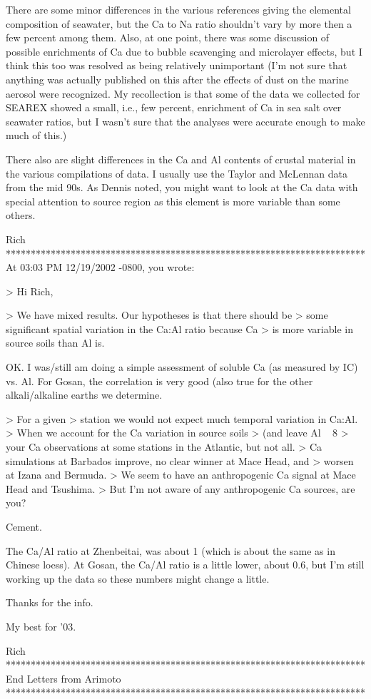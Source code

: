 \documentclass[final,dvips]{foils}
\begin{document}
{There are some minor differences in the various references giving the
elemental composition of seawater, but the Ca to Na ratio shouldn't
vary by more then a few percent among them.  Also, at one point, there
was some discussion of possible enrichments of Ca due to bubble
scavenging and microlayer effects, but I think this too was resolved
as being relatively unimportant (I'm not sure that anything was
actually published on this after the effects of dust on the marine
aerosol were recognized.  My recollection is that some of the data we
collected for SEAREX showed a small, i.e., few percent, enrichment of
Ca in sea salt over seawater ratios, but I wasn't sure that the
analyses were accurate enough to make much of this.) 

There also are slight differences in the Ca and Al contents of crustal
material in the various compilations of data.  I usually use the
Taylor and McLennan data from the mid 90s.  As Dennis noted, you might
want to look at the Ca data with special attention to source region as
this element is more variable than some others. 

Rich
************************************************************************
At 03:03 PM 12/19/2002 -0800, you wrote:

> Hi Rich,

> We have mixed results. Our hypotheses is that there should be
> some significant spatial variation in the Ca:Al ratio because Ca
> is more variable in source soils than Al is.

OK. I was/still am doing a simple assessment of soluble Ca (as
measured by IC) vs. Al.  For Gosan, the correlation is very good (also
true for the other alkali/alkaline earths we determine. 

> For a given
> station we would not expect much temporal variation in Ca:Al.
> When we account for the Ca variation in source soils
> (and leave Al ~ 8%
> your Ca observations at some stations in the Atlantic, but not all.
> Ca simulations at Barbados improve, no clear winner at Mace Head, and
> worsen at Izana and Bermuda.
> We seem to have an anthropogenic Ca signal at Mace Head and Tsushima.
> But I'm not aware of any anthropogenic Ca sources, are you?

Cement.

The Ca/Al ratio at Zhenbeitai, was about 1 (which is about the same as
in Chinese loess).  At Gosan, the Ca/Al ratio is a little lower, about
0.6, but I'm still working up the data so these numbers might change a
little. 

Thanks for the info.

My best for '03.

Rich
************************************************************************
End Letters from Arimoto
************************************************************************

} %
\end{document}
